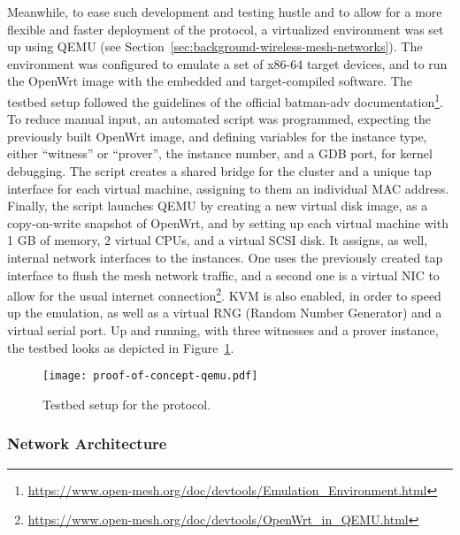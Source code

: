Meanwhile, to ease such development and testing hustle and to allow for a more flexible and faster deployment of the protocol, a virtualized environment was set up using QEMU (see Section~\ref{sec:background-wireless-mesh-networks}). The environment was configured to emulate a set of x86-64 target devices, and to run the OpenWrt image with the embedded and target-compiled \pol{} software. The testbed setup followed the guidelines of the official batman-adv documentation\footnote{\url{https://www.open-mesh.org/doc/devtools/Emulation_Environment.html}}. To reduce manual input, an automated script was programmed, expecting the previously built OpenWrt image, and defining variables for the instance type, either “witness” or “prover”, the instance number, and a GDB port, for kernel debugging. The script creates a shared bridge for the cluster and a unique tap interface for each virtual machine, assigning to them an individual MAC address. Finally, the script launches QEMU by creating a new virtual disk image, as a copy-on-write snapshot of OpenWrt, and by setting up each virtual machine with 1 GB of memory, 2 virtual CPUs, and a virtual SCSI disk. It assigns, as well, internal network interfaces to the instances. One uses the previously created tap interface to flush the mesh network traffic, and a second one is a virtual NIC to allow for the usual internet connection\footnote{\url{https://www.open-mesh.org/doc/devtools/OpenWrt_in_QEMU.html}}. KVM is also enabled, in order to speed up the emulation, as well as a virtual RNG (Random Number Generator) and a virtual serial port. Up and running, with three witnesses and a prover instance, the testbed looks as depicted in Figure~\ref{fig:infrastructure:testbed}.

\begin{figure}[h!]
    \begin{center}
    \texttt{[image: proof-of-concept-qemu.pdf]}
    \caption{Testbed setup for the \pol{} protocol.}
    \label{fig:infrastructure:testbed}
    \end{center}
\end{figure}

\subsubsection{Network Architecture} \label{sec:infrastructure:network-architecture}

